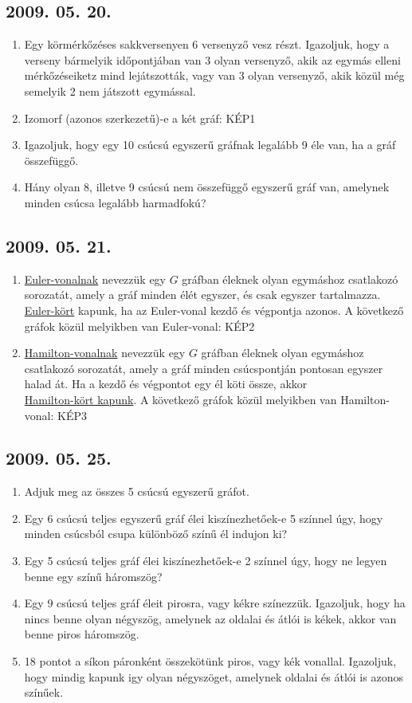 \subsection*{2009. 05. 20.}
\begin{enumerate}
\item Egy körmérkőzéses sakkversenyen  6 versenyző vesz részt. Igazoljuk, hogy a verseny bármelyik időpontjában van 3 olyan versenyző, akik az egymás elleni mérkőzéseiketz mind lejátszották, vagy van 3 olyan versenyző, akik közül még semelyik 2 nem játszott egymással.
\item Izomorf (azonos szerkezetű)-e a két gráf: KÉP1
\item Igazoljuk, hogy egy 10 csúcsú egyszerű gráfnak legalább 9 éle van, ha a gráf összefüggő.
\item Hány olyan 8, illetve 9 csúcsú nem összefüggő egyszerű gráf van, amelynek minden csúcsa legalább harmadfokú?
\end{enumerate}

\subsection*{2009. 05. 21.}
\begin{enumerate}
\item \underline{Euler-vonalnak} nevezzük egy $G$ gráfban éleknek olyan egymáshoz csatlakozó sorozatát, amely a gráf minden élét egyszer, és csak egyszer tartalmazza. \underline{Euler-kört} kapunk, ha az Euler-vonal kezdő és végpontja azonos. A következő gráfok közül melyikben van Euler-vonal: KÉP2
\item \underline{Hamilton-vonalnak} nevezzük egy $G$ gráfban éleknek olyan egymáshoz csatlakozó sorozatát, amely a gráf minden csúcspontján pontosan egyszer halad át. 
Ha a kezdő és végpontot egy él köti össze, akkor\\ \underline{Hamilton-kört kapunk}.
A következő gráfok közül melyikben van Hamilton-vonal: KÉP3
\end{enumerate}



\subsection*{2009. 05. 25.}
\begin{enumerate}
\item Adjuk meg az összes 5 csúcsú egyszerű gráfot.
\item Egy 6 csúcsú teljes egyszerű gráf élei kiszínezhetőek-e 5 színnel úgy, hogy minden csúcsból csupa különböző színű él indujon ki?
\item Egy 5 csúcsú teljes gráf élei kiszínezhetőek-e 2 színnel úgy, hogy ne legyen benne egy színű háromszög?
\item Egy 9 csúcsú teljes gráf éleit pirosra, vagy kékre színezzük. Igazoljuk, hogy ha nincs benne olyan négyszög, amelynek az oldalai és átlói is kékek, akkor van benne piros háromszög.
\item 18 pontot a síkon páronként összekötünk piros, vagy kék vonallal. Igazoljuk, hogy mindig kapunk igy olyan négyszöget, amelynek oldalai és átlói is azonos színűek.

\end{enumerate}


